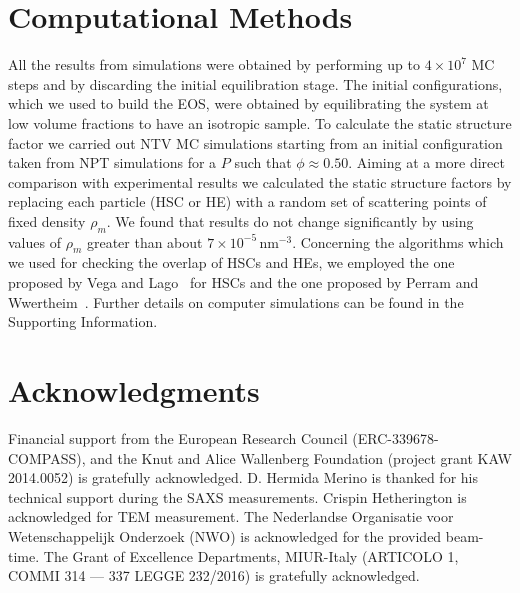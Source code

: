 \documentclass[aps,prl,preprint,superscriptaddress,showkeys]{revtex4-2} %
\def\nm{\,\si{\nano\meter}}%
\begin{document}
\section{Computational Methods}
All the results from simulations were obtained by performing up to $4\times10^7$ MC steps and by discarding the initial equilibration stage.
The initial configurations, which we used to build the EOS, were obtained by equilibrating the system at low volume fractions to have an isotropic
sample. To calculate the static structure factor we carried out NTV MC simulations starting from an initial configuration taken 
from NPT simulations for a $P$ such that $\phi\approx 0.50$. Aiming at a more direct comparison with experimental results we calculated
the static structure factors by replacing each particle (HSC or HE) with a random set of scattering points of fixed density $\rho_m$. We found
that results do not change significantly by using values of $\rho_m$ greater than about $7\times 10^{-5} \nm^{-3}$.%
Concerning the algorithms which we used for checking the overlap of HSCs and HEs, we employed the one proposed by Vega and Lago~\cite{VegaHSC1994} for HSCs and
the one proposed by Perram and Wwertheim~\cite{PerramJCP1985}. Further details on computer simulations can be found in the Supporting Information.
\section{Acknowledgments}
Financial support from the European Research Council (ERC-339678-COMPASS), and the Knut and Alice Wallenberg Foundation (project grant KAW 2014.0052) is gratefully acknowledged. D. Hermida Merino is thanked for his technical support during the SAXS measurements. Crispin Hetherington is acknowledged for TEM measurement. The Nederlandse Organisatie voor Wetenschappelijk Onderzoek (NWO) is acknowledged for the provided beam-time. The Grant of Excellence Departments, MIUR-Italy (ARTICOLO 1, COMMI 314 — 337 LEGGE 232/2016) is gratefully acknowledged.

\end{document}
